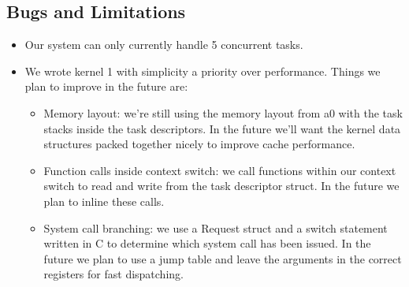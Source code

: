 \documentclass{article}
\begin{document}
\subsection{Bugs and Limitations}
\begin{itemize}
  \item Our system can only currently handle 5 concurrent tasks.
  \item We wrote kernel 1 with simplicity a priority over performance. Things we plan to improve in the future are:
\begin{itemize}
\item Memory layout: we're still using the memory layout from a0 with the task stacks inside the task descriptors. In the future we'll want the kernel data structures packed together nicely to improve cache performance.
\item Function calls inside context switch: we call functions within our context switch to read and write from the task descriptor struct. In the future we plan to inline these calls.
\item System call branching: we use a Request struct and a switch statement written in C to determine which system call has been issued. In the future we plan to use a jump table and leave the arguments in the correct registers for fast dispatching.
\end{itemize}
\end{itemize}
\end{document}
